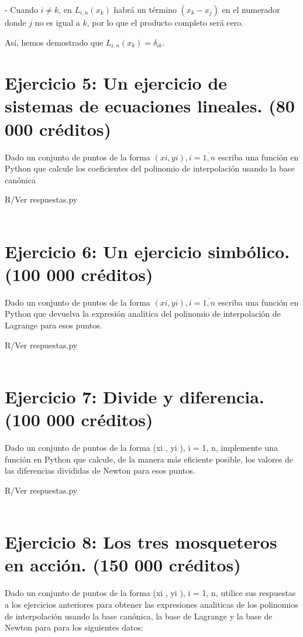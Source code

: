 \documentclass[a4paper,12pt]{article}
\begin{document}
- Cuando \( i \neq k \), en \( L_{i,n}(x_k) \) habrá un término \( (x_k - x_j) \) en el numerador donde \( j \) no es igual a \( k \), por lo que el producto completo será cero.

Así, hemos demostrado que \( L_{i,n}(x_k) = \delta_{ik} \).

\section*{Ejercicio 5: Un ejercicio de sistemas de ecuaciones lineales. (80 000 créditos)}

Dado un conjunto de puntos de la forma ${(xi , yi ), i = \overline{1, n}}$ escriba una función en Python que
calcule los coeficientes del polinomio de interpolación usando la base canónica

R/Ver respuestas.py\\\\

\section*{Ejercicio 6: Un ejercicio simbólico. (100 000 créditos)}

Dado un conjunto de puntos de la forma ${(xi , yi ), i = \overline{1, n}}$ escriba una función en Python que
devuelva la expresión analitica del polinomio de interpolación de Lagrange para esos puntos.

R/Ver respuestas.py\\\\

\section*{Ejercicio 7: Divide y diferencia. (100 000 créditos)}

Dado un conjunto de puntos de la forma {(xi , yi ), i = 1, n}, implemente una función en Python
que calcule, de la manera más eficiente posible, los valores de las diferencias divididas de Newton
para esos puntos.

R/Ver respuestas.py\\\\

\section*{Ejercicio 8: Los tres mosqueteros en acción. (150 000 créditos)}

Dado un conjunto de puntos de la forma {(xi , yi ), i = 1, n}, utilice sus respuestas a los ejercicios
anteriores para obtener las expresiones analiticas de los polinomios de interpolación usando la base
canónica, la base de Lagrange y la base de Newton para para los siguientes datos:
\end{document}
